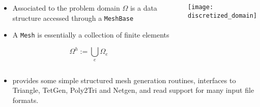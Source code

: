 \begin{frame}
  \begin{columns}[t]
    \begin{block}{}%
      \begin{itemize}
      \item{
	Associated to the problem domain $\Omega$ is a \libMesh{} data
	structure accessed through a \texttt{MeshBase}
      }

      \item{A \texttt{Mesh} is essentially
	a collection of finite elements}
      \end{itemize}
      \begin{equation}
	\label{eqn:discretized_domain}
	\nonumber
	\Omega^h:=\bigcup_e \Omega_e
      \end{equation}
    \end{block}
      \begin{center}
	\texttt{[image: discretized\_domain]}
      \end{center}
  \end{columns}
  {
  \begin{itemize}
    \item{\libMesh{} provides some simple structured mesh generation
routines, interfaces to Triangle, TetGen, Poly2Tri and Netgen, and read support for many input file formats.}
  \end{itemize}
  }
\end{frame}
